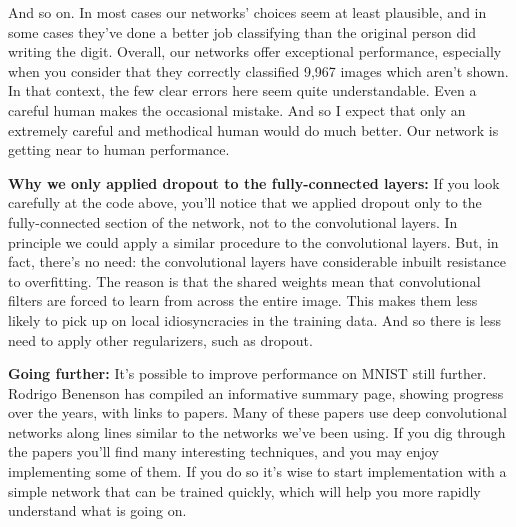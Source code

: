 \documentclass[a4paper,twoside,10pt]{book}
\begin{document}
And so on. In most cases our networks' choices seem at least plausible, and in some cases they've done a better job classifying than the original person did writing the digit. Overall, our networks offer exceptional performance, especially when you consider that they correctly classified 9,967 images which aren't shown. In that context, the few clear errors here seem quite understandable. Even a careful human makes the occasional mistake. And so I expect that only an extremely careful and methodical human would do much better. Our network is getting near to human performance.

\textbf{Why we only applied dropout to the fully-connected layers:} If you look carefully at the code above, you'll notice that we applied dropout only to the fully-connected section of the network, not to the convolutional layers. In principle we could apply a similar procedure to the convolutional layers. But, in fact, there's no need: the convolutional layers have considerable inbuilt resistance to overfitting. The reason is that the shared weights mean that convolutional filters are forced to learn from across the entire image. This makes them less likely to pick up on local idiosyncracies in the training data. And so there is less need to apply other regularizers, such as dropout.

\textbf{Going further:} It's possible to improve performance on MNIST still further. Rodrigo Benenson has compiled an informative summary page, showing progress over the years, with links to papers. Many of these papers use deep convolutional networks along lines similar to the networks we've been using. If you dig through the papers you'll find many interesting techniques, and you may enjoy implementing some of them. If you do so it's wise to start implementation with a simple network that can be trained quickly, which will help you more rapidly understand what is going on.
\end{document}
